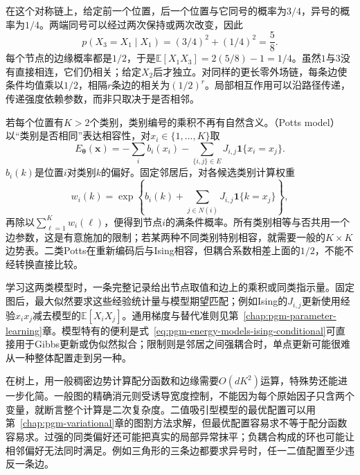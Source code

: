在这个对称链上，给定前一个位置，后一个位置与它同号的概率为$3/4$，异号的概率为$1/4$。两端同号可以经过两次保持或两次改变，因此
\[
  p(X_3=X_1\mid X_1)
    =(3/4)^2+(1/4)^2=\frac58.
\]
每个节点的边缘概率都是$1/2$，于是$\mathbb{E}[X_1X_3]=2(5/8)-1=1/4$。虽然$1$与$3$没有直接相连，它们仍相关；给定$X_2$后才独立。对同样的更长零外场链，每条边使条件均值乘以$1/2$，相隔$r$条边的相关为$(1/2)^r$。局部相互作用可以沿路径传递，传递强度依赖参数，而非只取决于是否相邻。

若每个位置有$K>2$个类别，类别编号的乘积不再有自然含义。（Potts model）以“类别是否相同”表达相容性，对$x_i\in\{1,\ldots,K\}$取
\begin{equation}
  E_{\bm{\theta}}(\bm{x})
   =-\sum_i b_i(x_i)
    -\sum_{\{i,j\}\in E}J_{i,j}\mathbf{1}\{x_i=x_j\}.
  \label{eq:pgm-energy-models-potts}
\end{equation}
$b_i(k)$是位置$i$对类别$k$的偏好。固定邻居后，对各候选类别计算权重
\[
  w_i(k)=\exp\left\{
    b_i(k)+\sum_{j\in N(i)}J_{i,j}\mathbf{1}\{k=x_j\}
  \right\},
\]
再除以$\sum_{\ell=1}^K w_i(\ell)$，便得到节点$i$的满条件概率。所有类别相等与否共用一个边参数，这是有意施加的限制；若某两种不同类别特别相容，就需要一般的$K\times K$边势表。二类Potts在重新编码后与Ising相容，但耦合系数相差上面的$1/2$，不能不经转换直接比较。

学习这两类模型时，一条完整记录给出节点取值和边上的乘积或同类指示量。固定图后，最大似然要求这些经验统计量与模型期望匹配；例如Ising的$J_{i,j}$更新使用经验$x_ix_j$减去模型的$\mathbb{E}[X_iX_j]$。通用梯度与替代准则见第~\ref{chap:pgm-parameter-learning}章。模型特有的便利是式~\eqref{eq:pgm-energy-models-ising-conditional}可直接用于Gibbs更新或伪似然拟合；限制则是邻居之间强耦合时，单点更新可能很难从一种整体配置走到另一种。

在树上，用一般稠密边势计算配分函数和边缘需要$O(dK^2)$运算，特殊势还能进一步化简。一般图的精确消元则受诱导宽度控制，不能因为每个原始因子只含两个变量，就断言整个计算是二次复杂度。二值吸引型模型的最优配置可以用第~\ref{chap:pgm-variational}章的图割方法求解，但最优配置容易求不等于配分函数容易求。过强的同类偏好还可能把真实的局部异常抹平；负耦合构成的环也可能让相邻偏好无法同时满足。例如三角形的三条边都要求异号时，任一二值配置至少违反一条边。


